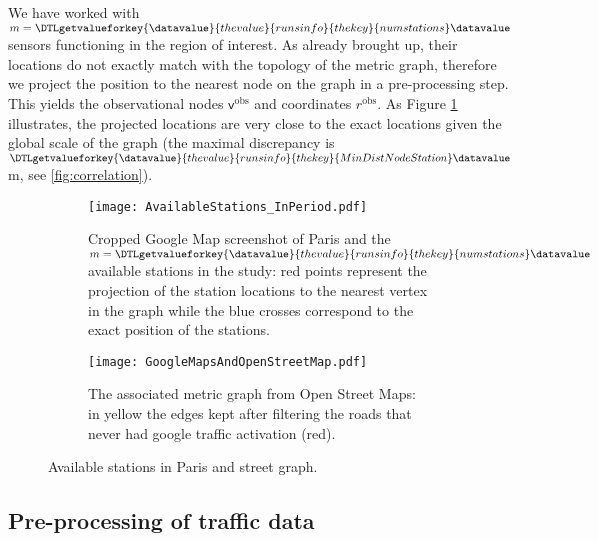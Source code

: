 \documentclass[11pt,a4paper,twoside]{article}
\newcommand{\perplexityinsert}[1]{\DTLgetvalueforkey{\datavalue}{thevalue}{runsinfo}{thekey}{#1}\datavalue}
\theoremstyle{definition}
\numberwithin{equation}{section}
\newcommand{\bR}{\ensuremath{\mathbb{R}}}
\newcommand{\vv}{\ensuremath{\textsf{v}}}
\newcommand{\<}{\langle}
\renewcommand{\>}{\rangle}
\newcommand{\obs}{\ensuremath{\text{obs}}}
\begin{document}
We have worked with $m=\perplexityinsert{numstations}$ sensors functioning in the region of interest. As already brought up, their locations do not exactly match with the topology of the metric graph, therefore we project the position to the nearest node on the graph in a pre-processing step. This yields the observational nodes $\vv^\obs$ and coordinates $r^\obs$. As Figure \ref{fig:paris-stations} illustrates, the projected locations are very close to the exact locations given the global scale of the graph (the maximal discrepancy is $\perplexityinsert{MinDistNodeStation}$m, see \cref{fig:correlation}). %


\begin{figure}
      \centering
      \begin{subfigure}[b]{0.48\textwidth}
          \centering
          \texttt{[image: AvailableStations\_InPeriod.pdf]}
          \caption{Cropped Google Map screenshot of Paris and the $m=\perplexityinsert{numstations}$ available stations in the study: red points represent the projection of the station locations to the nearest vertex in the graph while the blue crosses correspond to the exact position of the stations.}
          \label{fig:paris-stations}
      \end{subfigure}
      \hfill
      \begin{subfigure}[b]{0.48\textwidth}
          \centering
          \texttt{[image: GoogleMapsAndOpenStreetMap.pdf]}
          \caption{The associated metric graph from Open Street Maps: in yellow the edges kept after filtering the roads that never had google traffic activation (red).}
          \label{fig:paris-graph}
      \end{subfigure}
      \caption{Available stations in Paris and street graph.}
      \label{fig:stations-graph}
 \end{figure}


\subsection{Pre-processing of traffic data}
\label{sec:traffic-preprocess}
\end{document}
